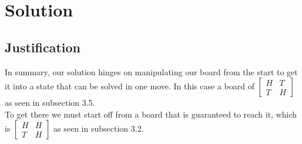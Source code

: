 \documentclass{article}
\begin{document}
\section{Solution}

\subsection{Justification}
In summary, our solution hinges on manipulating our board from the start to get it into a state that can be solved in one move. In this case a board of $\begin{bmatrix} 
        H & T \\
        T & H
        \end{bmatrix}$ as seen in subsection 3.5.
\\
To get there we must start off from a board that is guaranteed to reach it, which is $\begin{bmatrix} 
        H & H \\
        T & H
        \end{bmatrix}$ as seen in subsection 3.2. 
\end{document}
